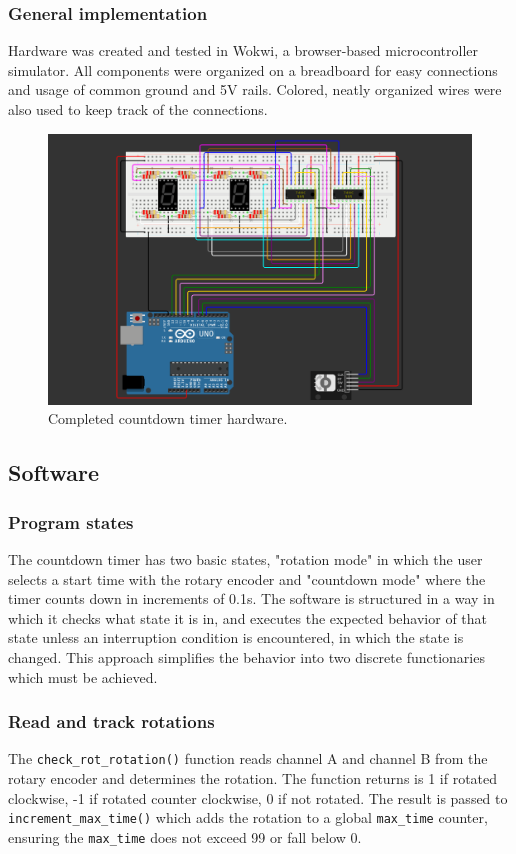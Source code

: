 \documentclass[fleqn]{article}
\begin{document}
\subsubsection*{General implementation}
Hardware was created and tested in Wokwi, a browser-based microcontroller simulator. All components were organized on a breadboard for easy connections and usage of common ground and 5V rails. Colored, neatly organized wires were also used to keep track of the connections.
\begin{figure}[H]
    \centering
    \includegraphics[width=5in]{circut.png}
    \caption{Completed countdown timer hardware.}
\end{figure}

\subsection*{Software}
\subsubsection*{Program states}
The countdown timer has two basic states, "rotation mode" in which the user selects a start time with the rotary encoder and "countdown mode" where the timer counts down in increments of 0.1s. The software is structured in a way in which it checks what state it is in, and executes the expected behavior of that state unless an interruption condition is encountered, in which the state is changed. This approach simplifies the behavior into two discrete functionaries which must be achieved.

\subsubsection*{Read and track rotations}
The \verb|check_rot_rotation()| function reads channel A and channel B from the rotary encoder and determines the rotation. The function returns is 1 if rotated clockwise, -1 if rotated counter clockwise, 0 if not rotated. The result is passed to \verb|increment_max_time()| which adds the rotation to a global \verb|max_time| counter, ensuring the \verb|max_time| does not exceed 99 or fall below 0.
\end{document}
